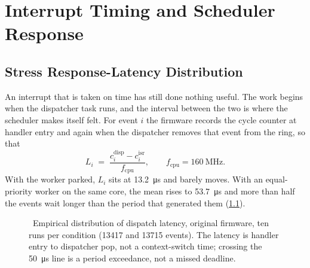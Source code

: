 \chapter{Interrupt Timing and Scheduler Response}
\section{Stress Response-Latency Distribution}
An interrupt that is taken on time has still done nothing useful. The work begins when the
dispatcher task runs, and the interval between the two is where the scheduler makes itself felt.
For event $i$ the firmware records the cycle counter at handler entry and again when the
dispatcher removes that event from the ring, so that
\begin{equation}
  L_i \;=\; \frac{c^{\mathrm{disp}}_i - c^{\mathrm{isr}}_i}{f_{\mathrm{cpu}}},
  \qquad f_{\mathrm{cpu}} = \SI{160}{\mega\hertz}.
\end{equation}
With the worker parked, $L_i$ sits at \SI{13.2}{\micro\second} and barely moves. With an
equal-priority worker on the same core, the mean rises to \SI{53.7}{\micro\second} and more than
half the events wait longer than the period that generated them (\cref{fig:ecdf}).

\begin{figure}[htbp]
\centering
{}
\caption{\evM\ Empirical distribution of dispatch latency, original firmware, ten runs per
condition (\num{13417} and \num{13715} events). The latency is handler entry to dispatcher pop, not a
context-switch time; crossing the \SI{50}{\micro\second} line is a period exceedance, not a missed deadline.}
\label{fig:ecdf}
\end{figure}

